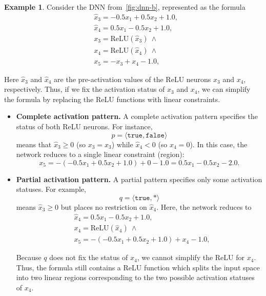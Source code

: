 \documentclass[oneside,11pt,dvipsnames]{book}
\numberwithin{equation}{section}
\theoremstyle{definition}
\newtheorem{example}{Example}[section]
\theoremstyle{remark}
\newcommand{\relu}[1]{\mathrm{ReLU}\left(#1\right)}
\begin{document}
\begin{example}  
Consider the DNN from~\autoref{fig:dnn-b}, represented as the formula
\[
\begin{aligned}
& \hat{x}_3 = -0.5x_1 + 0.5x_2 + 1.0, \\
& \hat{x}_4 = 0.5x_1 - 0.5x_2 + 1.0, \\    
& x_3 = \relu{\hat{x}_3} ~\land \\
& x_4 = \relu{\hat{x}_4} ~\land \\
& x_5 = -x_3 + x_4 - 1.0,
\end{aligned}
\]

Here $\hat{x}_3$ and $\hat{x}_4$ are the pre-activation values of the ReLU neurons $x_3$ and $x_4$, respectively. 
Thus, if we fix the activation status of $x_3$ and $x_4$, we can simplify the formula by replacing the ReLU functions with linear constraints.


\begin{itemize}
  \item \textbf{Complete activation pattern.}  
  A complete activation pattern specifies the status of both ReLU neurons.  
  For instance,
  \[
  p = \langle \texttt{true}, \texttt{false} \rangle
  \]
  means that $\hat{x}_3 \geq 0$ (so $x_3 = \hat{x}_3$) while $\hat{x}_4 < 0$ (so $x_4 = 0$).  
  In this case, the network reduces to a single linear constraint (region):
  \[
  x_5 = -(-0.5x_1 + 0.5x_2 + 1.0) + 0 - 1.0 = 0.5x_1 - 0.5x_2 - 2.0 .
  \]

  \item \textbf{Partial activation pattern.}  
  A partial pattern specifies only some activation statuses.  
  For example,
  \[
  q = \langle \texttt{true}, * \rangle
  \]
  means $\hat{x}_3 \geq 0$ but places no restriction on $\hat{x}_4$.  Here, the network reduces to
\[
\begin{aligned}
& \hat{x}_4 = 0.5x_1 - 0.5x_2 + 1.0, \\    
& x_4 = \relu{\hat{x}_4} ~\land \\
& x_5 = -(-0.5x_1 + 0.5x_2 + 1.0) + x_4 - 1.0,
\end{aligned}
\]

Because $q$ does not fix the status of $x_4$, we cannot simplify the ReLU for $x_4$. Thus, the formula still contains a ReLU function which splits the input space into two linear regions corresponding to the two possible activation statuses of $x_4$.
\end{itemize}
\end{example}
\end{document}
